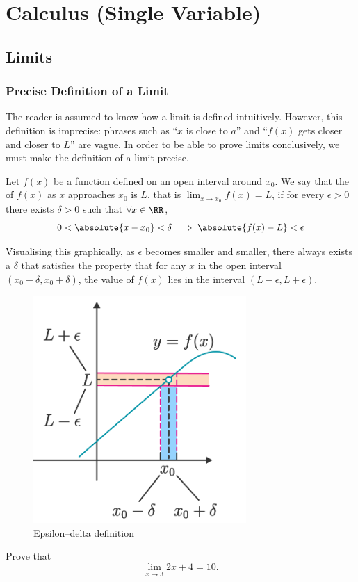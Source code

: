 \part{Calculus (Single Variable)}


\chapter{Limits}
\section{Precise Definition of a Limit}
The reader is assumed to know how a limit is defined intuitively. However, this definition is imprecise: phrases such as ``$x$ is close to $a$'' and ``$f(x)$ gets closer and closer to $L$'' are vague. In order to be able to prove limits conclusively, we must make the definition of a limit precise.

\begin{definition}
Let $f(x)$ be a function defined on an open interval around $x_0$. We say that the  of $f(x)$ as $x$ approaches $x_0$ is $L$, that is $\displaystyle\lim_{x \to x_0}f(x)=L$, if for every $\epsilon>0$ there exists $\delta > 0$ such that $\forall x \in \RR$, 
\[ 0<\absolute{x-x_0}<\delta \implies \absolute{f(x)-L}<\epsilon \] 
\end{definition} 

Visualising this graphically, as $\epsilon$ becomes smaller and smaller, there always exists a $\delta$ that satisfies the property that for any $x$ in the open interval $(x_0-\delta,x_0+\delta)$, the value of $f(x)$ lies in the interval $(L-\epsilon, L+\epsilon)$.

\begin{figure}[H]
	\centering
	\includegraphics[width=0.3\linewidth]{images/Epsilon_delta_definition.png}
    \caption{Epsilon--delta definition}
\end{figure}

\begin{exercise}{}{} 
Prove that \[ \lim_{x\to3}2x+4=10. \]
\end{exercise}

